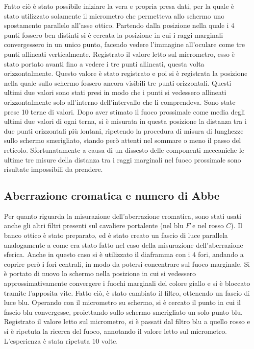 Fatto ciò è stato possibile 
iniziare la vera e propria presa dati, per la quale è stato 
utilizzato solamente il micrometro che permetteva allo schermo uno 
spostamento parallelo all'asse ottico. Partendo dalla posizione nella quale 
i 4 punti fossero ben distinti si è cercata la posizione in cui i 
raggi marginali convergessero in un unico punto, facendo vedere 
l'immagine all'oculare come tre punti allineati verticalmente. 
Registrato il valore letto sul micrometro, esso è stato portato avanti 
fino a vedere i tre punti allineati, questa volta
orizzontalmente. Questo valore è stato registrato e poi si è 
registrata la posizione nella quale sullo schermo fossero ancora visibili 
tre punti orizzontali. Questi ultimi due valori sono stati presi in modo 
che i punti si vedessero allineati orizzontalmente solo all'interno 
dell'intervallo che li comprendeva. Sono state prese 10 terne di valori. 
Dopo aver stimato il fuoco prossimale come media degli ultimi due valori 
di ogni terna, si è misurata in questa posizione la distanza tra i due 
punti orizzontali più lontani, ripetendo la procedura di misura di lunghezze sullo 
schermo smerigliato, stando però attenti nel sommare o meno il passo del reticolo.
Sfortunatamente a causa di un dissesto delle componenti meccaniche le 
ultime tre misure della distanza tra i raggi marginali nel 
fuoco prossimale sono risultate impossibili da prendere.

\subsection{Aberrazione cromatica e numero di Abbe}
Per quanto riguarda la misurazione dell'aberrazione cromatica, 
sono stati usati anche gli altri filtri presenti sul cavaliere 
portalente (nel blu $F$ e nel rosso $C$). Il banco ottico è stato 
preparato, ed è stato creato un fascio di luce parallela 
analogamente a come era stato fatto nel caso della misurazione 
dell'aberrazione sferica. Anche in questo caso si è utilizzato 
il diaframma con i 4 fori, andando a coprire però i fori 
centrali, in modo da potersi concentrare sul fuoco marginale. 
Si è portato di nuovo lo schermo nella posizione in cui si 
vedessero approssimativamente convergere i fuochi marginali 
del colore giallo e si è bloccato tramite l'apposita vite. 
Fatto ciò, è stato cambiato il filtro, ottenendo un fascio 
di luce blu. Operando con il micrometro su schermo, si è 
cercato il punto in cui il fascio blu convergesse, 
proiettando sullo schermo smerigliato un solo punto blu. 
Registrato il valore letto sul micrometro, si è passati 
dal filtro blu a quello rosso e si è ripetuta la ricerca 
del fuoco, annotando il valore letto sul micrometro. 
L'esperienza è stata ripetuta 10 volte.

